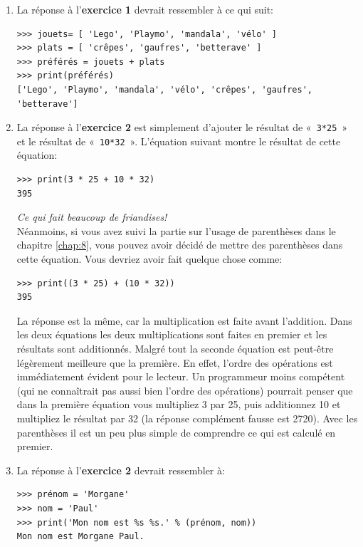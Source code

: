 \begin{enumerate}
\item La réponse à l'\textbf{exercice 1} devrait ressembler à ce qui suit:\\

\begin{small}
\begin{Verbatim}[frame=single,rulecolor=\color{mbleu}, label=à taper]
>>> jouets= [ 'Lego', 'Playmo', 'mandala', 'vélo' ]
>>> plats = [ 'crêpes', 'gaufres', 'betterave' ]
>>> préférés = jouets + plats
>>> print(préférés)
['Lego', 'Playmo', 'mandala', 'vélo', 'crêpes', 'gaufres', 'betterave']
\end{Verbatim}
\end{small}
\item  La réponse à l'\textbf{exercice 2} est simplement d'ajouter le résultat de «~\texttt{3*25}~» et le résultat de «~\texttt{10*32}~». L'équation suivant montre le résultat de cette équation:

\begin{Verbatim}[frame=single,rulecolor=\color{mbleu}, label=à taper]
>>> print(3 * 25 + 10 * 32)
395
\end{Verbatim}
\rm
\emph{Ce qui fait beaucoup de friandises!}\\

Néanmoins, si vous avez suivi la partie sur l'usage de parenthèses dans le chapitre \ref{chap:8}, vous pouvez avoir décidé de mettre des parenthèses dans cette équation. Vous devriez avoir fait quelque chose comme:
\tt
\begin{Verbatim}[frame=single,rulecolor=\color{mbleu}, label=à taper]
>>> print((3 * 25) + (10 * 32))
395
\end{Verbatim}
\rm

La réponse est la même, car la multiplication est faite avant l'addition. Dans les deux équations les deux multiplications sont faites en premier et les résultats sont additionnés. Malgré tout la seconde équation est peut-être légèrement meilleure que la première. En effet, l'ordre des opérations est immédiatement évident pour le lecteur. Un programmeur moins compétent (qui ne connaîtrait pas aussi bien l'ordre des opérations) pourrait penser que dans la première équation vous multipliez 3 par 25, puis additionnez 10 et multipliez le résultat par 32 (la réponse complément fausse est 2720). Avec les parenthèses il est un peu plus simple de comprendre ce qui est calculé en premier.

\item  La réponse à l'\textbf{exercice 2} devrait ressembler à:
\tt
\begin{Verbatim}[frame=single,rulecolor=\color{mbleu}, label=à taper]
>>> prénom = 'Morgane'
>>> nom = 'Paul'
>>> print('Mon nom est %s %s.' % (prénom, nom))
Mon nom est Morgane Paul.
\end{Verbatim}
\rm

\end{enumerate}


